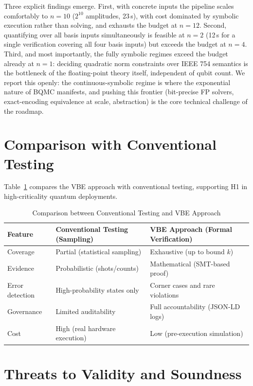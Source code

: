 \documentclass[journal]{IEEEtran} %
\begin{document}
Three explicit findings emerge. First, with concrete inputs the pipeline scales comfortably to $n = 10$ ($2^{10}$ amplitudes, 23\,s), with cost dominated by symbolic execution rather than solving, and exhausts the budget at $n = 12$. Second, quantifying over all basis inputs simultaneously is feasible at $n = 2$ (12\,s for a single verification covering all four basis inputs) but exceeds the budget at $n = 4$. Third, and most importantly, the fully symbolic regimes exceed the budget already at $n = 1$: deciding quadratic norm constraints over IEEE 754 semantics is the bottleneck of the floating-point theory itself, independent of qubit count. We report this openly: the continuous-symbolic regime is where the exponential nature of BQMC manifests, and pushing this frontier (bit-precise FP solvers, exact-encoding equivalence at scale, abstraction) is the core technical challenge of the roadmap.

\section{Comparison with Conventional Testing}
Table~\ref{tab:comparison} compares the VBE approach with conventional testing, supporting H1 in high-criticality quantum deployments.

\begin{table}[!t]
\centering
\caption{Comparison between Conventional Testing and VBE Approach}
\label{tab:comparison}
\footnotesize
\begin{tabularx}{\columnwidth}{@{}l>{\raggedright\arraybackslash}X>{\raggedright\arraybackslash}X@{}}
\toprule
\textbf{Feature} & \textbf{Conventional Testing (Sampling)} & \textbf{VBE Approach (Formal Verification)} \\
\midrule
Coverage & Partial (statistical sampling) & Exhaustive (up to bound $k$) \\
Evidence & Probabilistic (shots/counts) & Mathematical (SMT-based proof) \\
Error detection & High-probability states only & Corner cases and rare violations \\
Governance & Limited auditability & Full accountability (JSON-LD logs) \\
Cost & High (real hardware execution) & Low (pre-execution simulation) \\
\bottomrule
\end{tabularx}
\end{table}

\section{Threats to Validity and Soundness}
\label{sec:threats}
\end{document}
